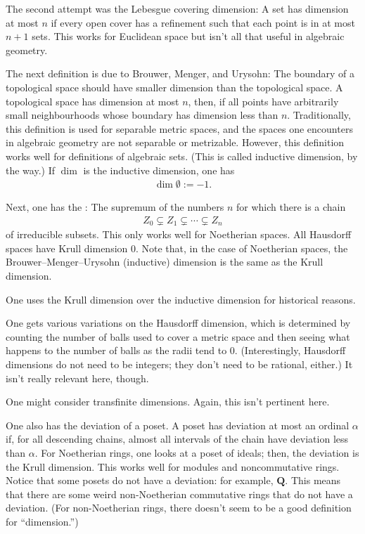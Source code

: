 \documentclass [11 pt, oneside, margin = 1 in] {article}
\begin{document}
The second attempt was the Lebesgue covering dimension: A set has dimension at most $n$ if every open cover has a refinement such that each point is in at most $n+1$ sets. This works for Euclidean space but isn't all that useful in algebraic geometry.

The next definition is due to Brouwer, Menger, and Urysohn: The boundary of a topological space should have smaller dimension than the topological space. A topological space has dimension at most $n$, then, if all points have arbitrarily small neighbourhoods whose boundary has dimension less than $n$. Traditionally, this definition is used for separable metric spaces, and the spaces one encounters in algebraic geometry are not separable or metrizable. However, this definition works well for definitions of algebraic sets. (This is called inductive dimension, by the way.) If $\dim$ is the inductive dimension, one has
\begin{align*}
	\dim \emptyset := -1.
\end{align*}

Next, one has the : The supremum of the numbers $n$ for which there is a chain
\begin{align*}
	Z_0\subsetneq Z_1\subsetneq \cdots \subsetneq Z_n
\end{align*}
of irreducible subsets. This only works well for Noetherian spaces. All Hausdorff spaces have Krull dimension $0$. Note that, in the case of Noetherian spaces, the Brouwer--Menger--Urysohn (inductive) dimension is the same as the Krull dimension.

\begin{remark}
	One uses the Krull dimension over the inductive dimension for historical reasons.
\end{remark}

One gets various variations on the Hausdorff dimension, which is determined by counting the number of balls used to cover a metric space and then seeing what happens to the number of balls as the radii tend to $0$. (Interestingly, Hausdorff dimensions do not need to be integers; they don't need to be rational, either.) It isn't really relevant here, though.

One might consider transfinite dimensions. Again, this isn't pertinent here.

One also has the deviation of a poset. A poset has deviation at most an ordinal $\alpha$ if, for all descending chains, almost all intervals of the chain have deviation less than $\alpha$. For Noetherian rings, one looks at a poset of ideals; then, the deviation is the Krull dimension. This works well for modules and noncommutative rings. Notice that some posets do not have a deviation: for example, $\mathbf{Q}$. This means that there are some weird non-Noetherian commutative rings that do not have a deviation. (For non-Noetherian rings, there doesn't seem to be a good definition for ``dimension.'')
\end{document}
